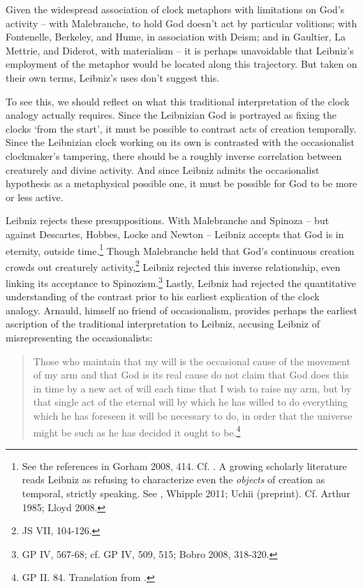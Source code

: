\documentclass{article}
\begin{document}
Given the widespread association of clock metaphors with limitations on
God's activity -- with Malebranche, to hold God doesn't act by
particular volitions; with Fontenelle, Berkeley, and Hume, in
association with Deism; and in Gaultier, La Mettrie, and Diderot, with
materialism -- it is perhaps unavoidable that Leibniz's employment of
the metaphor would be located along this trajectory. But taken on their
own terms, Leibniz's uses don't suggest this.

To see this, we should reflect on what this traditional interpretation
of the clock analogy actually requires. Since the Leibnizian God is
portrayed as fixing the clocks `from the start', it must be possible to
contrast acts of creation temporally. Since the Leibnizian clock working
on its own is contrasted with the occasionalist clockmaker's tampering,
there should be a roughly inverse correlation between creaturely and
divine activity. And since Leibniz admits the occasionalist hypothesis
as a metaphysical possible one, it must be possible for God to be more
or less active.

Leibniz rejects these presuppositions. With Malebranche and Spinoza --
but against Descartes, Hobbes, Locke and Newton -- Leibniz accepts that
God is in eternity, outside time.\footnote{See the references in Gorham
  2008, 414. Cf. \autocite[250]{Jolley2002}. A growing scholarly literature reads
  Leibniz as refusing to characterize even the \emph{objects} of
  creation as temporal, strictly speaking. See \autocite{Whipple2010}, Whipple 2011; Uchii
  (preprint). Cf. Arthur 1985; Lloyd 2008.} Though Malebranche held that
God's continuous creation crowds out creaturely activity,\footnote{JS
  VII, 104-126.} Leibniz rejected this inverse relationship, even
linking its acceptance to Spinozism.\footnote{GP IV, 567-68; cf. GP IV,
  509, 515; Bobro 2008, 318-320.} Lastly, Leibniz had rejected the
quantitative understanding of the contrast prior to his earliest
explication of the clock analogy. Arnauld, himself no friend of
occasionalism, provides perhaps the earliest ascription of the
traditional interpretation to Leibniz, accusing Leibniz of
misrepresenting the occasionalists:

\begin{quote}
Those who maintain that my will is the occasional cause of the movement
of my arm and that God is its real cause do not claim that God does this
in time by a new act of will each time that I wish to raise my arm, but
by that single act of the eternal will by which he has willed to do
everything which he has foreseen it will be necessary to do, in order
that the universe might be such as he has decided it ought to
be.\footnote{GP II. 84. Translation from \autocite[246]{Jolley2002}.}
\end{quote}
\end{document}
